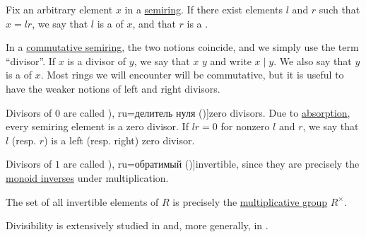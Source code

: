 \begin{definition}\label{def:divisibility}
  Fix an arbitrary element \( x \) in a \hyperref[def:semiring]{semiring}. If there exist elements \( l \) and \( r \) such that \( x = lr \), we say that \( l \) is a  of \( x \), and that \( r \) is a .

  In a \hyperref[def:semiring/commutative]{commutative semiring}, the two notions coincide, and we simply use the term \enquote{divisor}. If \( x \) is a divisor of \( y \), we say that \( x \)  \( y \) and write \( x \mid y \). We also say that \( y \) is a  of \( x \). Most rings we will encounter will be commutative, but it is useful to have the weaker notions of left and right divisors.

  \begin{thmenum}
     Divisors of \( 0 \) are called \term[bg=делител на нулата (\cite[def. V.2]{ГеновМиховскиМоллов1991Алгебра}), ru=делитель нуля (\cite[20]{Винберг2014Алгебра})]{zero divisors}. Due to \hyperref[def:semiring/absorption]{absorption}, every semiring element is a zero divisor. If \( lr = 0 \) for nonzero \( l \) and \( r \), we say that \( l \) (resp. \( r \)) is a  left (resp. right) zero divisor.

     Divisors of \( 1 \) are called \term[bg=обратим (\cite[def. V.3]{ГеновМиховскиМоллов1991Алгебра}), ru=обратимый (\cite[20]{Винберг2014Алгебра})]{invertible}, since they are precisely the \hyperref[def:monoid_inverse]{monoid inverses} under multiplication.
  \end{thmenum}
\end{definition}
\begin{comments}
  \item The set of all invertible elements of \( R \) is precisely the \hyperref[def:semiring]{multiplicative group} \( R^\times \).
  \item Divisibility is extensively studied in  and, more generally, in .
\end{comments}

